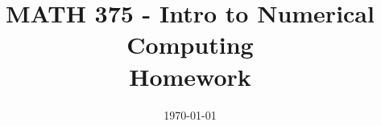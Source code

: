 \usepackage{fancyhdr}

\title{MATH 375 - Intro to Numerical Computing \\Homework \HWVersion}
\date{\today}

\pagestyle{fancy}
\fancyhf{}
\rhead{\today}
